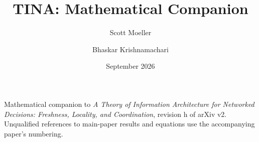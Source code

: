 \documentclass[11pt]{article}
\begin{document}
\title{TINA: Mathematical Companion}
\author{Scott Moeller \and Bhaskar Krishnamachari}
\date{September 2026}
\maketitle
\noindent Mathematical companion to \emph{A Theory of Information Architecture for Networked
Decisions: Freshness, Locality, and Coordination}, revision h of arXiv v2.
Unqualified references to main-paper results and equations use the accompanying paper's numbering.


\end{document}
